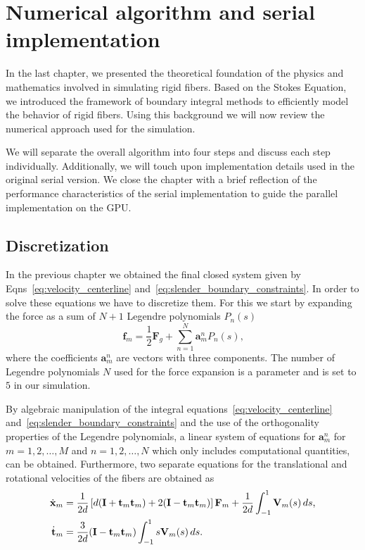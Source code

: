 \chapter{Numerical algorithm and serial implementation}
\label{cha:serial_implementation}

In the last chapter, we presented the theoretical foundation of the physics and mathematics involved in simulating rigid fibers. Based on the Stokes Equation, we introduced the framework of boundary integral methods to efficiently model the behavior of rigid fibers. Using this background we will now review the numerical approach used for the simulation.

We will separate the overall algorithm into four steps and discuss each step individually. Additionally, we will touch upon implementation details used in the original serial version. We close the chapter with a brief reflection of the performance characteristics of the serial implementation to guide the parallel implementation on the GPU.

\section{Discretization}
\label{sec:serial_discretization}
In the previous chapter we obtained the final closed system given by Eqns~\eqref{eq:velocity_centerline} and~\eqref{eq:slender_boundary_constraints}. In order to solve these equations we have to discretize them. For this we start by expanding the force as a sum of $N+1$ Legendre polynomials $P_n(s)$
\begin{equation}
  \label{eq:force_discretization}
  \mathbf{f}_m = \frac{1}{2}\mathbf{F}_g + \sum_{n=1}^{N}\mathbf{a}_{m}^{n} P_n(s) \text{,}
\end{equation}
where the coefficients $\mathbf{a}_m^n$ are vectors with three components. The number of Legendre polynomials $N$ used for the force expansion is a parameter and is set to $5$ in our simulation.

By algebraic manipulation of the integral equations~\eqref{eq:velocity_centerline} and~\eqref{eq:slender_boundary_constraints} and the use of the orthogonality properties of the Legendre polynomials, a linear system of equations for $\mathbf{a}_m^n$ for $m=1,2,\dots,M$ and $n=1,2,\dots,N$ which only includes computational quantities, can be obtained. Furthermore, two separate equations for the translational and rotational velocities of the fibers are obtained as 
\begin{align}
	\dot{\mathbf{x}}_m &= \frac{1}{2d}\left[d(\mathbf{I}+\mathbf{t}_m\mathbf{t}_m) + 2(\mathbf{I}-\mathbf{t}_m\mathbf{t}_m)\right] \mathbf{F}_m + \frac{1}{2d} \int_{-1}^{1} \mathbf{V}_m(s) \, ds \text{,} \label{eq:delta_translate_velocity} \\
	\dot{\mathbf{t}}_m &= \frac{3}{2d}(\mathbf{I}-\mathbf{t}_m\mathbf{t}_m) \int_{-1}^{1}s\mathbf{V}_m(s) \, ds \text{.}\label{eq:delta_rotate_velocity}
\end{align}

